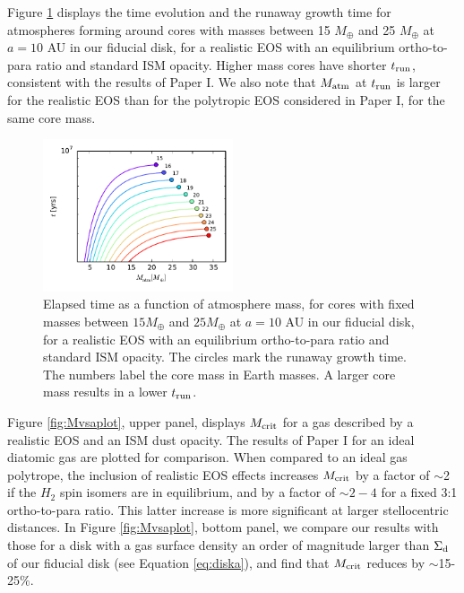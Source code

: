 
Figure \ref{fig:tvsMplot} displays the time evolution and the runaway growth time for atmospheres forming around cores with masses between 15 $M_{\oplus}$ and 25 $M_{\oplus}$ at $a=10$ AU in our fiducial disk, for a realistic EOS with an equilibrium ortho-to-para ratio and standard ISM opacity. Higher mass cores have shorter $t_{\rm run}$, consistent with the results of Paper I. We also note that $M_{\rm atm}$ at $t_{\rm run}$ is larger for the realistic EOS than for the polytropic EOS considered in Paper I, for the same core mass.

\begin{figure}[h!]
\centering
\includegraphics[width=0.5\textwidth]{figures/t_vs_M_10au.pdf}
\caption{Elapsed time as a function of atmosphere mass, for cores with fixed masses between $15 M_{\oplus}$ and $25 M_{\oplus}$ at $a=10$ AU in our fiducial disk, for a realistic EOS with an equilibrium ortho-to-para ratio and standard ISM opacity. The circles mark the runaway growth time. The numbers label the core mass in Earth masses. A larger core mass results in a lower $t_{\rm run}$.}%
\label{fig:tvsMplot}
\end{figure}



Figure \ref{fig:Mvsaplot}, upper panel, displays $M_{\rm crit}$
for a gas described by a realistic EOS and an ISM dust opacity. The results of Paper I for an ideal diatomic gas are plotted for comparison. When compared to an ideal gas polytrope, the inclusion of realistic EOS effects increases $M_{\rm crit}$ by a factor of $\sim$2 if the $H_2$ spin isomers are in equilibrium, and by a factor of $\sim$$2-4$ for a fixed 3:1 ortho-to-para ratio. This latter increase is more significant at larger stellocentric distances. In Figure \ref{fig:Mvsaplot}, bottom panel, we compare our results with those for a disk with a gas surface density an order of magnitude larger than $\Sigma_{\rm d}$ of our fiducial disk (see Equation \ref{eq:diska}), and find that $M_{\rm crit}$ reduces by $\sim$15-25$\%$.

